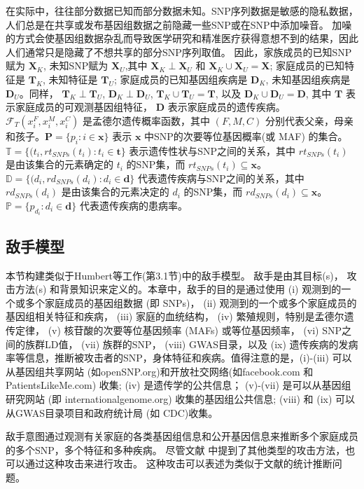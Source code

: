在实际中，往往部分数据已知而部分数据未知。SNP序列数据是敏感的隐私数据，人们总是在共享或发布基因组数据之前隐藏一些SNP或在SNP中添加噪音。 加噪的方式会使基因组数据杂乱而导致医学研究和精准医疗获得意想不到的结果，因此人们通常只是隐藏了不想共享的部分SNP序列取值。 因此，家族成员的已知SNP赋为 $\mathbf{X}_K$, 未知SNP赋为 $\mathbf{X}_U$,其中 $\mathbf{X}_K \perp\mathbf{X}_U$ 和 $\mathbf{X}_K \cup \mathbf{X}_U = \mathbf{X}$; 家庭成员的已知特征是 $\mathbf{T}_K$, 未知特征是 $\mathbf{T}_U$; 家庭成员的已知基因组疾病是 $\mathbf{D}_K$, 未知基因组疾病是 $\mathbf{D}_U$。同样， $\mathbf{T}_K \perp \mathbf{T}_U$, $\mathbf{D}_K \perp \mathbf{D}_U$, $\mathbf{T}_K \cup \mathbf{T}_U = \mathbf{T}$, 以及 $\mathbf{D}_K \cup \mathbf{D}_U = \mathbf{D}$, 其中 $\mathbf{T}$ 表示家庭成员的可观测基因组特征， $\mathbf{D}$ 表示家庭成员的遗传疾病。 $\mathcal{F}_T(x_i^F,x_i^M,x_i^C)$ 是孟德尔遗传概率函数，其中 $(F,M,C)$ 分别代表父亲，母亲和孩子。$\mathbf{P}=\{p_i: i \in \mathbf{x}\}$ 表示 $\mathbf{x}$ 中SNP的次要等位基因概率(或 MAF) 的集合。 $\mathbb{T}=\{(t_i,rt_{SNPs}(t_i): t_i \in \mathbf{t}\}$ 表示遗传性状与SNP之间的关系，其中 $rt_{SNPs}(t_i)$ 是由该集合的元素确定的 $t_i$ 的SNP集，而 $rt_{SNPs}(t_i) \subseteq \mathbf{x}$。 $\mathbb{D}=\{(d_i,rd_{SNPs}(d_i): d_i \in \mathbf{d}\}$ 代表遗传疾病与SNP之间的关系，其中 $rd_{SNPs}(d_i)$ 是由该集合的元素决定的 $d_i$ 的SNP集，而 $rd_{SNPs}(d_i) \subseteq \mathbf{x}$。 $\mathbb{P}=\{p_{d_i}: d_i \in \mathbf{d}\}$ 代表遗传疾病的患病率。

\subsection{敌手模型}

本节构建类似于Humbert等工作\cite{humbert2013addressing}(第3.1节)中的敌手模型。 敌手是由其目标(s)， 攻击方法(s) 和背景知识来定义的。本章中，敌手的目的是通过使用 (i) 观测到的一个或多个家庭成员的基因组数据 (即 SNPs)，  (ii) 观测到的一个或多个家庭成员的基因组相关特征和疾病， (iii) 家庭的血统结构， (iv) 繁殖规则，特别是孟德尔遗传定律， (v) 核苷酸的次要等位基因频率 (MAFs) 或等位基因频率， (vi) SNP之间的族群LD值， (vii) 族群的SNP， (viii) GWAS目录，以及 (ix) 遗传疾病的发病率等信息，推断被攻击者的SNP，身体特征和疾病。值得注意的是，(i)-(iii) 可以从基因组共享网站 (如openSNP.org)和开放社交网络(如facebook.com 和 PatientsLikeMe.com) 收集; (iv) 是遗传学的公共信息； (v)-(vii) 是可以从基因组研究网站 (即 internationalgenome.org) 收集的基因组公共信息; (viii) 和 (ix) 可以从GWAS目录项目和政府统计局 (如 CDC)收集。

敌手意图通过观测有关家庭的各类基因组信息和公开基因信息来推断多个家庭成员的多个SNP，多个特征和多种疾病。 尽管文献\cite{humbert2013addressing} 中提到了其他类型的攻击方法，也可以通过这种攻击来进行攻击。 这种攻击可以表述为类似于文献\cite{humbert2013addressing,humbert2017quantifying,deznabi2018inference}的统计推断问题。

